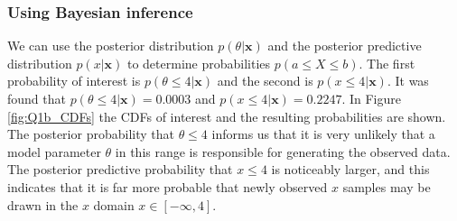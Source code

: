 \documentclass{article}
\begin{document}
\subsubsection*{Using Bayesian inference}
We can use the posterior distribution $p(\theta \vert \mathbf{x})$ and the posterior predictive distribution $p(x \vert \mathbf{x})$ to determine probabilities $p(a \leq X \leq b)$. The first probability of interest is $p(\theta \leq 4 \vert \mathbf{x})$ and the second is $p(x \leq 4 \vert \mathbf{x})$. It was found that $p(\theta \leq 4 \vert \mathbf{x}) = 0.0003$ and $p(x \leq 4 \vert \mathbf{x}) = 0.2247$. In Figure \ref{fig:Q1b_CDFs} the CDFs of interest and the resulting probabilities are shown. The posterior probability that $\theta \leq 4$ informs us that it is very unlikely that a model parameter $\theta$ in this range is responsible for generating the observed data. The posterior predictive probability that $x \leq 4$ is noticeably larger, and this indicates that it is far more probable that newly observed $x$ samples may be drawn in the $x$ domain $x \in [-\infty, 4]$. 
\end{document}

